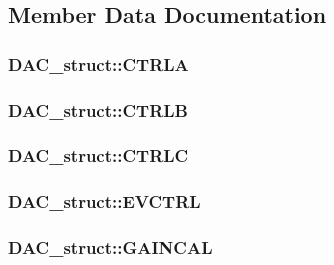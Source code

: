 \subsection{Member Data Documentation}
\hypertarget{struct_d_a_c__struct_a879ded61410fa73fc38b0d0e22959ad3}{
\subsubsection[{CTRLA}]{ {\bf DAC\_\-struct::CTRLA}}}
\label{struct_d_a_c__struct_a879ded61410fa73fc38b0d0e22959ad3}
\hypertarget{struct_d_a_c__struct_a5404d0b804e297d6de5d531ae675e3d3}{
\subsubsection[{CTRLB}]{ {\bf DAC\_\-struct::CTRLB}}}
\label{struct_d_a_c__struct_a5404d0b804e297d6de5d531ae675e3d3}
\hypertarget{struct_d_a_c__struct_a23784d1c9c5cbcf6a6fa70de1acb82d9}{
\subsubsection[{CTRLC}]{ {\bf DAC\_\-struct::CTRLC}}}
\label{struct_d_a_c__struct_a23784d1c9c5cbcf6a6fa70de1acb82d9}
\hypertarget{struct_d_a_c__struct_a73e35617bc3d6501b7b6f23d554bf2b8}{
\subsubsection[{EVCTRL}]{ {\bf DAC\_\-struct::EVCTRL}}}
\label{struct_d_a_c__struct_a73e35617bc3d6501b7b6f23d554bf2b8}
\hypertarget{struct_d_a_c__struct_a2b05928d4be4edbe8395d5ee1ebf7cca}{
\subsubsection[{GAINCAL}]{ {\bf DAC\_\-struct::GAINCAL}}}
